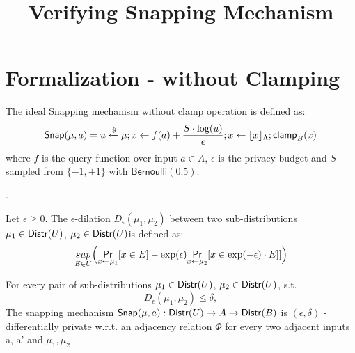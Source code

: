 \documentclass{article}
\begin{document}
\title{Verifying Snapping Mechanism}

\maketitle

\section{Formalization - without Clamping}
\begin{defn}
The ideal Snapping mechanism without clamp operation is defined as:
\[
	\mathsf{Snap}(\mu, a) = u \xleftarrow{\$} \mu; x \leftarrow  f(a) + \frac{ S \cdot \log(u)}{\epsilon}; x \leftarrow \lfloor x \rfloor_{\Lambda}; \mathsf{clamp}_B (x)
\]
where $f$ is the query function over input $a \in A$, $\epsilon$ is the privacy budget and $S$ sampled from $ \{-1, +1\}$ with $\mathsf{Bernoulli}(0.5)$.
\end{defn}

\begin{defn}
.

Let $\epsilon \geq 0$. The $\epsilon$-dilation $D_{\epsilon}(\mu_1, \mu_2)$ between two sub-distributions $\mu_1 \in \mathsf{Distr}(U)$, $\mu_2 \in \mathsf{Distr}(U)$is defined as:
\[	
	\underset{E \in U}{sup}\Big(\underset{x \leftarrow \mu_1}{\mathsf{Pr}}[x \in E] - \exp(\epsilon) \underset{x \leftarrow \mu_2}{\mathsf{Pr}}[x \in \exp(-\epsilon) \cdot E]]\Big)
\]
\end{defn}

\begin{prop}
For every pair of sub-distributions $\mu_1 \in \mathsf{Distr}(U)$, $\mu_2 \in \mathsf{Distr}(U)$, s.t. 
\[
D_{\epsilon}(\mu_1, \mu_2) \leq \delta,
\]
The snapping mechanism $\mathsf{Snap}(\mu, a) : \mathsf{Distr}(U) \to A \to \mathsf{Distr}(B)$ is $(\epsilon, \delta)$ - differentially private w.r.t. an adjacency relation $\Phi$ for every two adjacent inputs a, a’ and $\mu_1, \mu_2$
\end{prop}
\end{document}

